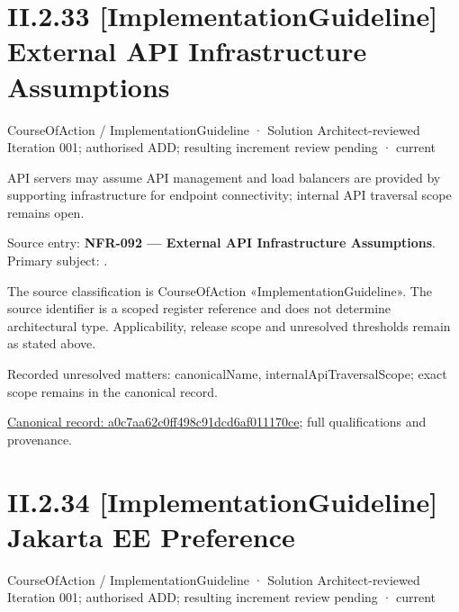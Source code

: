 \section*{II.2.33 [ImplementationGuideline] External API Infrastructure Assumptions}
\label{navigation:II.2.33}

\label{element:a0c7aa62c0ff498c91dcd6af011170ce}
{\small CourseOfAction / ImplementationGuideline · Solution Architect-reviewed Iteration 001; authorised ADD; resulting increment review pending · current}\par

API servers may assume API management and load balancers are provided by supporting infrastructure for endpoint connectivity; internal API traversal scope remains open.



Source entry: \textbf{NFR-092 — External API Infrastructure Assumptions}. Primary subject: \texttt{}.



The source classification is CourseOfAction «ImplementationGuideline». The source identifier is a scoped register reference and does not determine architectural type. Applicability, release scope and unresolved thresholds remain as stated above.


{\small Recorded unresolved matters: canonicalName, internalApiTraversalScope; exact scope remains in the canonical record.}\par
{\footnotesize \href{../../../../../../../continuum/strategy/course-of-action/implementation-guideline/a0c7aa62c0ff498c91dcd6af011170ce.md}{Canonical record: a0c7aa62c0ff498c91dcd6af011170ce}; full qualifications and provenance.}\par
\section*{II.2.34 [ImplementationGuideline] Jakarta EE Preference}
\label{navigation:II.2.34}

\label{element:17ae70b671b5451a812df11d59ff6e1c}
{\small CourseOfAction / ImplementationGuideline · Solution Architect-reviewed Iteration 001; authorised ADD; resulting increment review pending · current}\par

